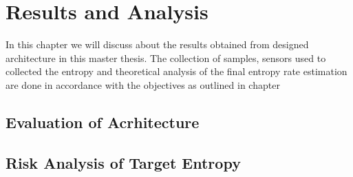 \chapter{Results and Analysis}
\label{ch:RA}
In this chapter we will discuss about the results obtained from designed architecture in this master thesis. The collection of samples, sensors used to collected the entropy and theoretical analysis of the final entropy rate estimation are done in accordance with the objectives as outlined in chapter \

%
%
\section{Evaluation of Acrhitecture}
\label{sec:RA:EA}

%
%
\section{Risk Analysis of Target Entropy}
\label{sec:RA:RATE}

